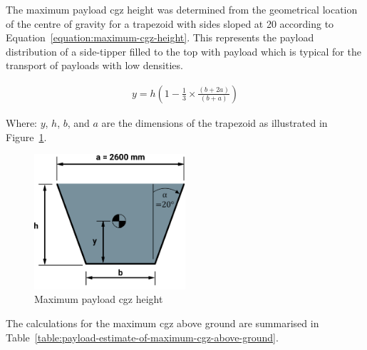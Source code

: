 The maximum payload \gls{cgz} height was determined from the geometrical location of the centre of gravity for a trapezoid with sides sloped at 20\degree{} according to Equation~\ref{equation:maximum-cgz-height}. This represents the payload distribution of a side-tipper filled to the top with payload which is typical for the transport of payloads with low densities.

\begin{align}
	\label{equation:maximum-cgz-height}
	y = h  \left ( 1 - \frac{1}{3} \times \frac{(b+2a)}{(b+a)} \right )
\end{align}

Where: $y$, $h$, $b$, and $a$ are the dimensions of the trapezoid as illustrated in Figure~\ref{figure:maximum-payload-cgz-height}.

\begin{figure}[H]
	\centering
	\includegraphics[width=0.5\textwidth]{fig/jad_payload_cgz_max}
	\caption{Maximum payload \gls{cgz} height}
	\label{figure:maximum-payload-cgz-height}
\end{figure}

The calculations for the maximum \gls{cgz} above ground are summarised in Table~\ref{table:payload-estimate-of-maximum-cgz-above-ground}.


